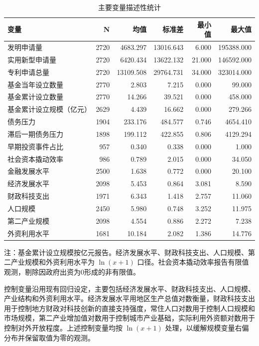 \documentclass[UTF8,a4paper,zihao=5,fontset=fandol]{ctexart}
\newcommand{\ERJTableFont}{%
  \fangsong\zihao{-5}%
  \setlength{\tabcolsep}{2pt}%
  \renewcommand{\arraystretch}{1.16}%
}
\newcommand{\ERJTableNoteFont}{\songti\zihao{6}}
\renewcommand{\arraystretch}{1.18}%
\begin{document}
\begin{table}[htbp]
  \centering
  \caption{主要变量描述性统计}
  {\ERJTableFont
  \begin{tabular}{@{}L{4.2cm} r r r r r@{}}
    \toprule
    变量 & N & 均值 & 标准差 & 最小值 & 最大值 \\
    \midrule
    发明申请量 & 2720 & 4683.297 & 13016.643 & 6.000 & 195388.000 \\
    实用新型申请量 & 2720 & 6420.434 & 13622.132 & 21.000 & 146592.000 \\
    专利申请总量 & 2720 & 13109.508 & 29764.731 & 34.000 & 323014.000 \\
    基金当年设立数量 & 2770 & 2.803 & 7.215 & 0.000 & 99.000 \\
    基金累计设立数量 & 2770 & 14.266 & 39.521 & 0.000 & 458.000 \\
    基金累计设立规模（亿元） & 2629 & 4.439 & 16.662 & 0.000 & 279.266 \\
    债务压力 & 1904 & 233.176 & 484.577 & 0.746 & 4654.410 \\
    滞后一期债务压力 & 1898 & 199.112 & 422.855 & 0.806 & 4129.294 \\
    早期投资事件占比 & 957 & 0.340 & 0.338 & 0.000 & 1.000 \\
    社会资本撬动效率 & 986 & 0.789 & 2.015 & 0.000 & 34.050 \\
    金融发展水平 & 2500 & 1.638 & 0.772 & 0.000 & 20.100 \\
    经济发展水平 & 2098 & 5.453 & 0.864 & 3.081 & 8.590 \\
    财政科技支出 & 1971 & 6.343 & 1.418 & 2.757 & 11.060 \\
    人口规模 & 2450 & 5.980 & 0.748 & 3.252 & 11.975 \\
    第二产业规模 & 2098 & 4.554 & 0.886 & 2.272 & 7.238 \\
    外资利用水平 & 1681 & 10.184 & 2.082 & 1.386 & 14.776 \\
    \bottomrule
  \end{tabular}

  \par\smallskip
  {\ERJTableNoteFont 注：基金累计设立规模按亿元报告。经济发展水平、财政科技支出、人口规模、第二产业规模和外资利用水平为 $\ln(x+1)$ 口径。社会资本撬动效率报告有限值观测，剔除因政府出资为0形成的非有限值。}
  }
\end{table}

控制变量沿用现有回归设定，主要包括经济发展水平、财政科技支出、人口规模、产业结构和外资利用水平。经济发展水平用地区生产总值对数衡量，财政科技支出用于控制地方财政对科技创新的直接支持强度，常住人口对数用于控制人口规模和市场规模，第二产业增加值对数用于控制城市产业基础，实际利用外资额对数用于控制对外开放程度。上述控制变量均按 $\ln(x+1)$ 处理，以缓解规模变量右偏分布并保留取值为零的观测。
\end{document}
